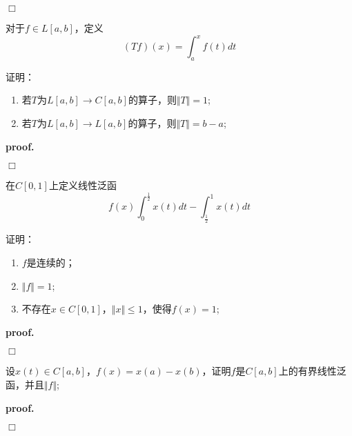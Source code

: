 $\Box$

\begin{mdframed}
    \begin{question}
        对于$f\in L[a,b]$，定义
        \begin{equation}
            (Tf)(x)=\int_{a}^{x}f(t)dt
        \end{equation}

        证明：
        \begin{enumerate}[itemindent=2em]
            \item 若$T$为$L[a,b]\rightarrow C[a,b]$的算子，则$\Vert T\Vert=1$;
            \item 若$T$为$L[a,b]\rightarrow L[a,b]$的算子，则$\Vert T\Vert=b-a$;
        \end{enumerate}
    \end{question}
\end{mdframed}

\textbf{proof.}

$\Box$

\begin{mdframed}
    \begin{question}
        在$C[0,1]$上定义线性泛函
        \begin{equation}
            f(x)\int_{0}^{\frac{1}{2}}x(t)dt-\int_{\frac{1}{2}}^{1}x(t)dt
        \end{equation}

        证明：
        \begin{enumerate}[itemindent=2em]
            \item $f$是连续的；
            \item $\Vert f\Vert=1$;
            \item 不存在$x\in C[0,1]$，$\Vert x\Vert\leqslant 1$，使得$f(x)=1$;
        \end{enumerate}
    \end{question}
\end{mdframed}

\textbf{proof.}

$\Box$

\begin{mdframed}
    \begin{question}
        设$x(t)\in C[a,b]$，$f(x)=x(a)-x(b)$，证明$f$是$C[a,b]$上的有界线性泛函，并且$\Vert f\Vert$;
    \end{question}
\end{mdframed}

\textbf{proof.}

$\Box$

